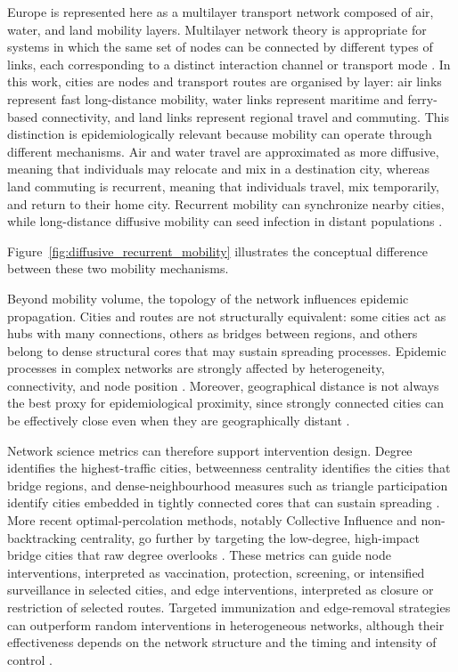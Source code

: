 Europe is represented here as a multilayer transport network composed of air, water, and land mobility layers. Multilayer network theory is appropriate for systems in which the same set of nodes can be connected by different types of links, each corresponding to a distinct interaction channel or transport mode \cite{kivela2014multilayer,boccaletti2014structure}. In this work, cities are nodes and transport routes are organised by layer: air links represent fast long-distance mobility, water links represent maritime and ferry-based connectivity, and land links represent regional travel and commuting. This distinction is epidemiologically relevant because mobility can operate through different mechanisms. Air and water travel are approximated as more diffusive, meaning that individuals may relocate and mix in a destination city, whereas land commuting is recurrent, meaning that individuals travel, mix temporarily, and return to their home city. Recurrent mobility can synchronize nearby cities, while long-distance diffusive mobility can seed infection in distant populations \cite{belik2011mobility,balcan:multiscale}.

Figure~\ref{fig:diffusive_recurrent_mobility} illustrates the conceptual difference between these two mobility mechanisms.

Beyond mobility volume, the topology of the network influences epidemic propagation. Cities and routes are not structurally equivalent: some cities act as hubs with many connections, others as bridges between regions, and others belong to dense structural cores that may sustain spreading processes. Epidemic processes in complex networks are strongly affected by heterogeneity, connectivity, and node position \cite{pastorsatorras:review}. Moreover, geographical distance is not always the best proxy for epidemiological proximity, since strongly connected cities can be effectively close even when they are geographically distant \cite{brockmann2013hidden}.

Network science metrics can therefore support intervention design. Degree identifies the highest-traffic cities, betweenness centrality identifies the cities that bridge regions, and dense-neighbourhood measures such as triangle participation identify cities embedded in tightly connected cores that can sustain spreading \cite{kitsak:spreaders,milo:motifs}. More recent optimal-percolation methods, notably Collective Influence and non-backtracking centrality, go further by targeting the low-degree, high-impact bridge cities that raw degree overlooks \cite{morone:influence,radicchi:nonbacktracking}. These metrics can guide node interventions, interpreted as vaccination, protection, screening, or intensified surveillance in selected cities, and edge interventions, interpreted as closure or restriction of selected routes. Targeted immunization and edge-removal strategies can outperform random interventions in heterogeneous networks, although their effectiveness depends on the network structure and the timing and intensity of control \cite{pastorsatorras:immunization,bajardi2011mobility,yang2013edge}.

